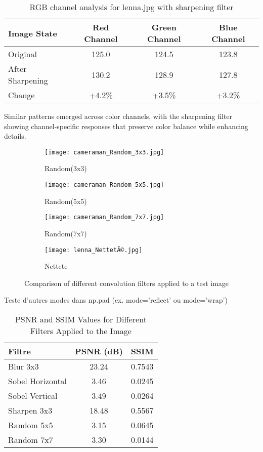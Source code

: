 \documentclass[12pt,a4paper]{article}
\begin{document}
	\begin{table}[H]
		\centering
		\caption{RGB channel analysis for lenna.jpg with sharpening filter}
		\begin{tabular}{@{}lccc@{}}
			\toprule
			\textbf{Image State} & \textbf{Red Channel} & \textbf{Green Channel} & \textbf{Blue Channel} \\
			\midrule
			Original & 125.0 & 124.5 & 123.8 \\
			After Sharpening & 130.2 & 128.9 & 127.8 \\
			Change & +4.2\% & +3.5\% & +3.2\% \\
			\bottomrule
		\end{tabular}
	\end{table}
	
	Similar patterns emerged across color channels, with the sharpening filter showing channel-specific responses that preserve color balance while enhancing details.
	\newpage
	\begin{figure}[h]
		\centering
		\begin{subfigure}{0.49\linewidth}
			\texttt{[image: cameraman\_Random\_3x3.jpg]}
			\caption{Random(3x3)}
		\end{subfigure}
		\begin{subfigure}{0.49\linewidth}
			\texttt{[image: cameraman\_Random\_5x5.jpg]}
			\caption{Random(5x5)}
		\end{subfigure}
		\begin{subfigure}{0.49\linewidth}
			\texttt{[image: cameraman\_Random\_7x7.jpg]}
			\caption{Random(7x7)}
		\end{subfigure}
		\begin{subfigure}{0.49\linewidth}
			\texttt{[image: lenna\_NettetÃ©.jpg]}
			\caption{Nettete}
		\end{subfigure}
		\caption{Comparison of different convolution filters applied to a test image}
		\label{fig:original_gray}
	\end{figure}
	Teste d’autres modes dans np.pad (ex. mode='reflect' ou mode='wrap')
	\newpage
	\begin{table}[h]
		\centering
		\caption{PSNR and SSIM Values for Different Filters Applied to the Image}
		\label{tab:psnr_ssim}
		\begin{tabular}{|l|c|c|}
			\hline
			\textbf{Filtre} & \textbf{PSNR (dB)} & \textbf{SSIM} \\
			\hline
			Blur 3x3       & 23.24            & 0.7543        \\
			Sobel Horizontal & 3.46             & 0.0245        \\
			Sobel Vertical  & 3.49             & 0.0264        \\
			Sharpen 3x3    & 18.48            & 0.5567        \\
			Random 5x5     & 3.15             & 0.0645        \\
			Random 7x7     & 3.30             & 0.0144        \\
			\hline
		\end{tabular}
	\end{table}
\end{document}
